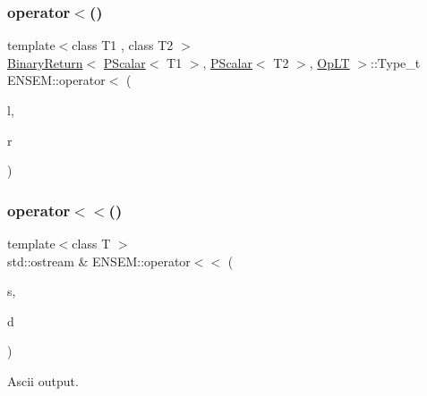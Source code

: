 \mbox{\label{group__primscalar_ga898f0000029c1749bdd5a60160848adb}} 
\subsubsection{\texorpdfstring{operator$<$()}{operator<()}}
{\footnotesize\ttfamily template$<$class T1 , class T2 $>$ \\
\mbox{\hyperlink{structENSEM_1_1BinaryReturn}{Binary\+Return}}$<$ \mbox{\hyperlink{classENSEM_1_1PScalar}{P\+Scalar}}$<$ T1 $>$, \mbox{\hyperlink{classENSEM_1_1PScalar}{P\+Scalar}}$<$ T2 $>$, \mbox{\hyperlink{structENSEM_1_1OpLT}{Op\+LT}} $>$\+::Type\+\_\+t E\+N\+S\+E\+M\+::operator$<$ (\begin{DoxyParamCaption}\item[{const \mbox{\hyperlink{classENSEM_1_1PScalar}{P\+Scalar}}$<$ T1 $>$ \&}]{l,  }\item[{const \mbox{\hyperlink{classENSEM_1_1PScalar}{P\+Scalar}}$<$ T2 $>$ \&}]{r }\end{DoxyParamCaption})\hspace{0.3cm}{\ttfamily [inline]}}

\mbox{\label{group__primscalar_ga48eed9feafd51dc2ff5915922fc68275}} 
\subsubsection{\texorpdfstring{operator$<$$<$()}{operator<<()}\hspace{0.1cm}{\footnotesize\ttfamily [1/4]}}
{\footnotesize\ttfamily template$<$class T $>$ \\
std\+::ostream \& E\+N\+S\+E\+M\+::operator$<$$<$ (\begin{DoxyParamCaption}\item[{std\+::ostream \&}]{s,  }\item[{const \mbox{\hyperlink{classENSEM_1_1PScalar}{P\+Scalar}}$<$ T $>$ \&}]{d }\end{DoxyParamCaption})\hspace{0.3cm}{\ttfamily [inline]}}



Ascii output. 

